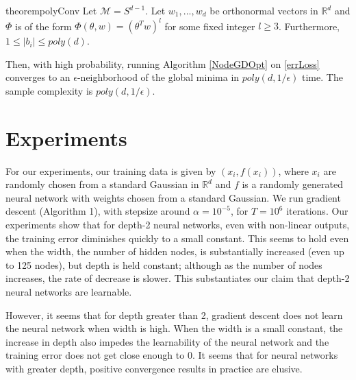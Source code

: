 \documentclass[11pt]{article}
\newcommand{\R}{{\mathbb{R}}}
\begin{document}
\begin{restatable}{theorem}{polyConv}
\label{PolyConv}
Let $\mathcal{M} = S^{d-1}$. Let $w_1,...,w_d$ be orthonormal vectors in $\R^d$ and $\Phi$ is of the form $\Phi(\theta,w) = (\theta^Tw)^l$ for some fixed integer $l \geq 3$. Furthermore, $1 \leq |b_i|\leq poly(d)$. 

Then, with high probability, running Algorithm \ref{NodeGDOpt} on \eqref{errLoss} converges to an $\epsilon$-neighborhood of the global minima in $poly(d,1/\epsilon)$ time. The sample complexity is $poly(d,1/\epsilon)$.
\end{restatable}



 
\section{Experiments}
\label{experiments}
For our experiments, our training data is given by $(x_i, f(x_i))$, where $x_i$ are randomly chosen from a standard Gaussian in $\R^d$ and $f$ is a randomly generated neural network with weights chosen from a standard Gaussian. We run gradient descent (Algorithm 1), with stepsize around $\alpha = 10^{-5}$, for $T = 10^6$ iterations. Our experiments show that for depth-2 neural networks, even with non-linear outputs, the training error diminishes quickly to a small constant. This seems to hold even when the width, the number of hidden nodes, is substantially increased (even up to 125 nodes), but depth is held constant; although as the number of nodes increases, the rate of decrease is slower. This substantiates our claim that depth-2 neural networks are learnable.

However, it seems that for depth greater than 2, gradient descent does not learn the neural network when width is high. When the width is a small constant, the increase in depth also impedes the learnability of the neural network and the training error does not get close enough to 0. It seems that for neural networks with greater depth, positive convergence results in practice are elusive.
\end{document}
